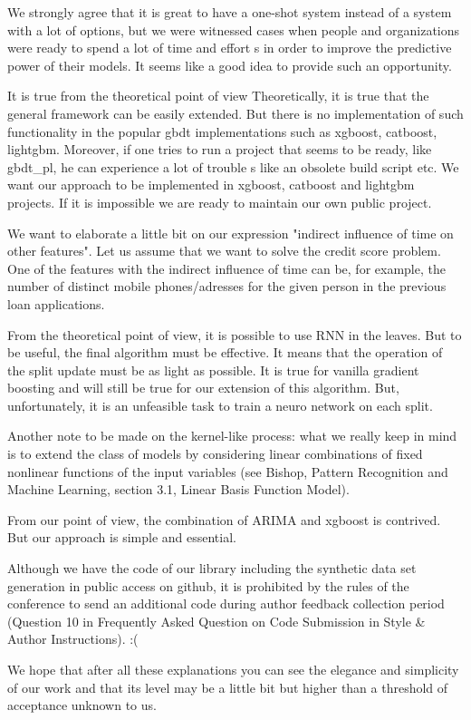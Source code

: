 \documentclass[a4paper,12pt]{extarticle}
\begin{document}
We strongly agree that it is great to have a {\color{red}one-shot} system instead of {\color{red} a} system with a lot of options, but we {\color{red}were} witnessed cases when people and organizations were ready to spend a lot of time and effort {\color{red}s} in order to improve {\color{red} the} predictive power of their models. It seems like a good idea to provide such an opportunity.

{\color{red} It is true from the theoretical point of view} {\color{green} Theoretically, it is true} that {\color{red} the} general framework can be easily extended. But there is no implementation of such functionality in the popular gbdt implementations such as xgboost, catboost, lightgbm. Moreover, if one tries to run {\color{red} a} project that seems to be ready, like gbdt\_pl, he can experience a lot of trouble {\color{red}s} like {\color{red} an} obsolete build script etc. We want our approach to be implemented in xgboost, catboost and lightgbm projects. If it is impossible we are ready to maintain our own public project.

We want to elaborate a little bit {\color{red} on} our expression "indirect influence of time on other features". Let us assume that we want to solve {\color{red} the} credit score problem. One of the features with the indirect influence of time can be, for example, the number of distinct mobile phones/adresses for {\color{red}the} given person in the previous loan applications.

From the theoretical point of view, it is possible to use RNN in the leaves. But to be useful, {\color{red} the} final algorithm must be effective. It means that {\color{red} the} operation of the split update must be as light as possible. It is true for vanilla gradient boosting and {\color{red} will} still be true for our extension of this algorithm. But, unfortunately, it is {\color{red} an} unfeasible task to train {\color{red} a} neuro network on each split.  

{\color{blue} Another note to be made} on the kernel-like process: what we really keep in mind is to extend the class of models by considering linear combinations of fixed nonlinear functions of the input variables (see Bishop, Pattern Recognition and Machine Learning, section 3.1, Linear Basis Function Model).

From our point of view, the combination of ARIMA and xgboost is contrived. But our approach is simple and essential.

Although we have the code of our library including the synthetic data set generation in public access on github, it is prohibited by the rules of the conference to send an additional code during author feedback {\color{red} collection period} (Question 10 in Frequently Asked Question on Code Submission in Style \& Author Instructions).  :(

We hope that after all these explanations you can see {\color{red}the} elegance and simplicity of our work and that its level {\color{red}may be} a little bit {\color{blue}but} higher than {\color{red} a} threshold of acceptance unknown to us.
\end{document}
